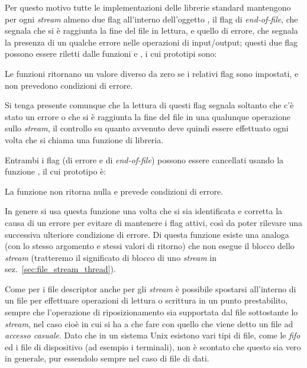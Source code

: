 Per questo motivo tutte le implementazioni delle librerie standard mantengono
per ogni \textit{stream} almeno due flag all'interno dell'oggetto ,
il flag di \textit{end-of-file}, che segnala che si è raggiunta la fine del
file in lettura, e quello di errore, che segnala la presenza di un qualche
errore nelle operazioni di input/output; questi due flag possono essere
riletti dalle funzioni  e , i cui prototipi sono:

\begin{funcproto}{
}

{Le funzioni ritornano un valore diverso da zero se i relativi flag sono
  impostati, e non prevedono condizioni di errore.}
\end{funcproto}

Si tenga presente comunque che la lettura di questi flag segnala soltanto che
c'è stato un errore o che si è raggiunta la fine del file in una qualunque
operazione sullo \textit{stream}, il controllo su quanto avvenuto deve quindi
essere effettuato ogni volta che si chiama una funzione di libreria.

Entrambi i flag (di errore e di \textit{end-of-file}) possono essere
cancellati usando la funzione , il cui prototipo è:

\begin{funcproto}{
}

{La funzione non ritorna nulla e prevede condizioni di errore.}  
\end{funcproto}

In genere si usa questa funzione una volta che si sia identificata e corretta
la causa di un errore per evitare di mantenere i flag attivi, così da poter
rilevare una successiva ulteriore condizione di errore. Di questa funzione
esiste una analoga  (con lo stesso argomento e
stessi valori di ritorno) che non esegue il blocco dello \textit{stream}
(tratteremo il significato di blocco di uno \textit{stream} in
sez.~\ref{sec:file_stream_thread}).

Come per i file descriptor anche per gli \textit{stream} è possibile spostarsi
all'interno di un file per effettuare operazioni di lettura o scrittura in un
punto prestabilito, sempre che l'operazione di riposizionamento sia supportata
dal file sottostante lo \textit{stream}, nel caso cioè in cui si ha a che fare
con quello che viene detto un file ad \textsl{accesso casuale}. Dato che in un
sistema Unix esistono vari tipi di file, come le \textit{fifo} ed i file di
dispositivo (ad esempio i terminali), non è scontato che questo sia vero in
generale, pur essendolo sempre nel caso di file di dati.

